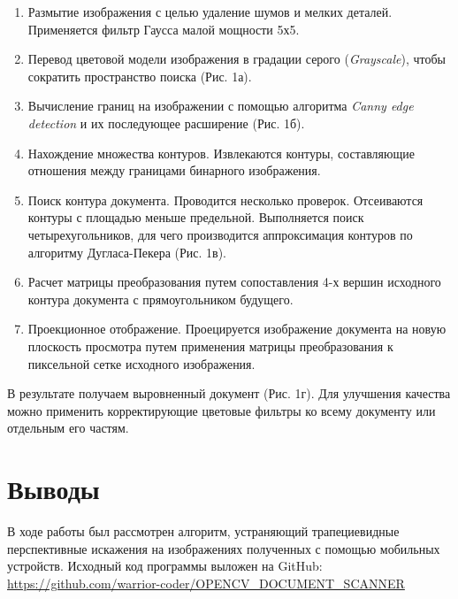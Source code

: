 \documentclass[a4paper,10pt,twoside]{article}
\begin{document}
\begin{multicols}{2}
{\begin{enumerate}%
\item Размытие изображения с целью удаление шумов и мелких деталей. Применяется фильтр Гаусса малой мощности 5х5.
\item Перевод цветовой модели изображения в градации серого (\textit{Grayscale}), чтобы сократить пространство поиска (Рис. 1а).
\item Вычисление границ на изображении с помощью алгоритма \textit{Canny edge detection} и их последующее расширение (Рис. 1б).
\item Нахождение множества контуров. Извлекаются контуры, составляющие отношения между границами бинарного изображения.
\item Поиск контура документа. Проводится несколько проверок. Отсеиваются контуры с площадью меньше предельной. Выполняется поиск четырехугольников, для чего производится аппроксимация контуров по алгоритму Дугласа-Пекера (Рис. 1в).
\item Расчет матрицы преобразования путем сопоставления 4-х вершин исходного контура документа с прямоугольником будущего.
\item Проекционное отображение. Проецируется изображение документа на новую плоскость просмотра путем применения матрицы преобразования к пиксельной сетке исходного изображения.
\end{enumerate}%


В результате получаем выровненный документ (Рис. 1г). Для улучшения качества можно применить корректирующие цветовые фильтры ко всему документу или отдельным его частям.
}%

\section{Выводы}
В ходе работы был рассмотрен алгоритм, устраняющий трапециевидные перспективные искажения на изображениях полученных с помощью мобильных устройств. Исходный код программы выложен на GitHub: \textcolor{blue}{\url{https://github.com/warrior-coder/OPENCV_DOCUMENT_SCANNER}}

%
%

%

\end{multicols}
%
\end{document}
